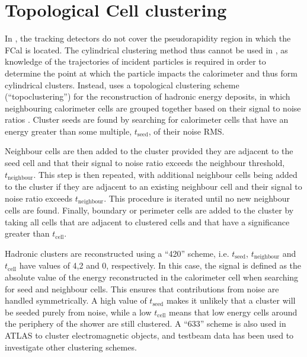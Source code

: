 %
%
%
%
%
%
%
\clearpage
\section{Topological Cell clustering}
\label{FCALTB_topoclusters}
In \atlas, the tracking detectors do not cover the pseudorapidity region in which the FCal is located. The cylindrical clustering method thus cannot be used in \atlas, as knowledge of the trajectories of incident particles is required in order to determine the point at which the particle impacts the calorimeter and thus form cylindrical clusters. Instead, \atlas uses a topological clustering scheme (``topoclustering'') for the reconstruction of hadronic energy deposits, in which neighbouring calorimeter cells are grouped together based on their signal to noise ratios \cite{Lampl:1099735}. Cluster seeds are found by searching for calorimeter cells that have an energy greater than some multiple, $t_\mathrm{seed}$, of their noise RMS. 

Neighbour cells are then added to the cluster provided they are adjacent to the seed cell and that their signal to noise ratio exceeds the neighbour threshold, $t_\mathrm{neighbour}$. This step is then repeated, with additional neighbour cells being added to the cluster if they are adjacent to an existing neighbour cell and their signal to noise ratio exceeds $t_\mathrm{neighbour}$. This procedure is iterated until no new neighbour cells are found. Finally, boundary or perimeter cells are added to the cluster by taking all cells that are adjacent to clustered cells and that have a significance greater than $t_\mathrm{cell}$. 

Hadronic clusters are reconstructed using a ``420'' scheme, i.e. $t_\mathrm{seed}$, $t_\mathrm{neighbour}$ and $t_\mathrm{cell}$ have values of 4,2 and 0, respectively. In this case, the signal is defined as the absolute value of the energy reconstructed in the calorimeter cell when searching for seed and neighbour cells. This ensures that contributions from noise are handled symmetrically. A high value of $t_\mathrm{seed}$ makes it unlikely that a cluster will be seeded purely from noise, while a  low $t_\mathrm{cell}$  means that low  energy cells around the periphery of the shower are still clustered. A ``633'' scheme is also used in ATLAS to cluster electromagnetic objects, and testbeam data has been used to investigate other clustering schemes\cite{LouiseThesis}. 


